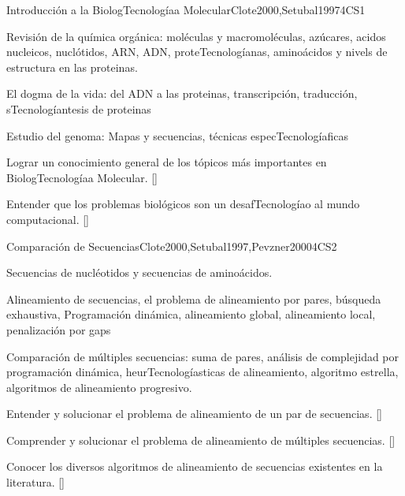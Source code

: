 \begin{syllabus}
\begin{unit}{Introducción a la BiologTecnologíaa Molecular}{}{Clote2000,Setubal1997}{4}{CS1}
\begin{topics}
\item Revisión de la química orgánica: moléculas y macromoléculas, azúcares, acidos nucleicos, nuclótidos, ARN, ADN, proteTecnologíanas, aminoácidos y nivels de estructura en las proteinas. 
\item El dogma de la vida: del ADN a las proteinas, transcripción, traducción, sTecnologíantesis de proteinas
\item Estudio del genoma: Mapas y secuencias, técnicas especTecnologíaficas
\end{topics}
   \begin{learningoutcomes}
      \item  Lograr un conocimiento general de los tópicos más importantes en BiologTecnologíaa Molecular. [\Familiarity]
	  \item Entender que los problemas biológicos son un desafTecnologíao al mundo computacional. [\Assessment]
   \end{learningoutcomes}
\end{unit}

\begin{unit}{Comparación de Secuencias}{}{Clote2000,Setubal1997,Pevzner2000}{4}{CS2}
\begin{topics}
\item Secuencias de nucléotidos y secuencias de aminoácidos.
\item Alineamiento de secuencias, el problema de alineamiento por pares, búsqueda exhaustiva, Programación dinámica, alineamiento global, alineamiento local, penalización por gaps
\item Comparación de múltiples secuencias: suma de pares, análisis de complejidad por programación dinámica, heurTecnologíasticas de alineamiento, algoritmo estrella, algoritmos de alineamiento progresivo.
\end{topics}
\begin{learningoutcomes}
\item  Entender y solucionar el problema de alineamiento de un par de secuencias. [\Usage]
\item  Comprender y solucionar el problema de alineamiento de múltiples secuencias. [\Usage]
\item Conocer los diversos algoritmos de alineamiento de secuencias existentes en la literatura. [\Familiarity]
\end{learningoutcomes}
\end{unit}


\end{syllabus}
